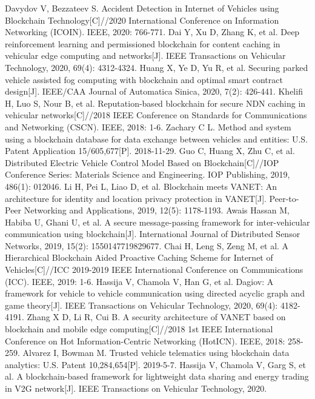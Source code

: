 \begin{thebibliography}{99}
 Davydov V, Bezzateev S. Accident Detection in Internet of Vehicles using Blockchain Technology[C]//2020 International Conference on Information Networking (ICOIN). IEEE, 2020: 766-771.
 Dai Y, Xu D, Zhang K, et al. Deep reinforcement learning and permissioned blockchain for content caching in vehicular edge computing and networks[J]. IEEE Transactions on Vehicular Technology, 2020, 69(4): 4312-4324.
 Huang X, Ye D, Yu R, et al. Securing parked vehicle assisted fog computing with blockchain and optimal smart contract design[J]. IEEE/CAA Journal of Automatica Sinica, 2020, 7(2): 426-441.
 Khelifi H, Luo S, Nour B, et al. Reputation-based blockchain for secure NDN caching in vehicular networks[C]//2018 IEEE Conference on Standards for Communications and Networking (CSCN). IEEE, 2018: 1-6.
 Zachary C L. Method and system using a blockchain database for data exchange between vehicles and entities: U.S. Patent Application 15/605,677[P]. 2018-11-29.
 Guo C, Huang X, Zhu C, et al. Distributed Electric Vehicle Control Model Based on Blockchain[C]//IOP Conference Series: Materials Science and Engineering. IOP Publishing, 2019, 486(1): 012046.
 Li H, Pei L, Liao D, et al. Blockchain meets VANET: An architecture for identity and location privacy protection in VANET[J]. Peer-to-Peer Networking and Applications, 2019, 12(5): 1178-1193.
 Awais Hassan M, Habiba U, Ghani U, et al. A secure message-passing framework for inter-vehicular communication using blockchain[J]. International Journal of Distributed Sensor Networks, 2019, 15(2): 1550147719829677.
 Chai H, Leng S, Zeng M, et al. A Hierarchical Blockchain Aided Proactive Caching Scheme for Internet of Vehicles[C]//ICC 2019-2019 IEEE International Conference on Communications (ICC). IEEE, 2019: 1-6.
 Hassija V, Chamola V, Han G, et al. Dagiov: A framework for vehicle to vehicle communication using directed acyclic graph and game theory[J]. IEEE Transactions on Vehicular Technology, 2020, 69(4): 4182-4191.
 Zhang X D, Li R, Cui B. A security architecture of VANET based on blockchain and mobile edge computing[C]//2018 1st IEEE International Conference on Hot Information-Centric Networking (HotICN). IEEE, 2018: 258-259.
 Alvarez I, Bowman M. Trusted vehicle telematics using blockchain data analytics: U.S. Patent 10,284,654[P]. 2019-5-7.
 Hassija V, Chamola V, Garg S, et al. A blockchain-based framework for lightweight data sharing and energy trading in V2G network[J]. IEEE Transactions on Vehicular Technology, 2020.

\end{thebibliography}
